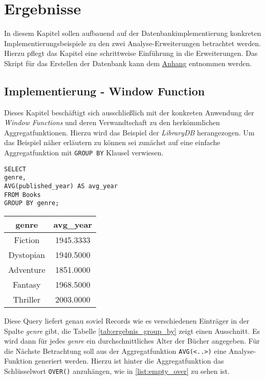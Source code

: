 \chapter{Ergebnisse}
\label{chap:ergebnis} In diesem Kapitel sollen aufbauend auf der Datenbankimplementierung
konkreten Implementierungsbeispiele zu den zwei Analyse-Erweiterungen betrachtet
werden. Hierzu pflegt das Kapitel eine schrittweise Einführung in die
Erweiterungen. Das Skript für das Erstellen der Datenbank kann dem \hyperref[sec:library_db]{Anhang}
entnommen werden.

\section{Implementierung - Window Function}
\label{sec:window_function} Dieses Kapitel beschäftigt sich ausschließlich mit der
konkreten Anwendung der \textit{Window Functions} und deren Verwandtschaft zu
den herkömmlichen Aggregatfunktionen. Hierzu wird das Beispiel der \textit{LibraryDB}
herangezogen. Um das Beispiel näher erläutern zu können sei zunächst auf eine einfache
Aggregatfunktion mit \texttt{GROUP BY} Klausel verwiesen.

\begin{minipage}{0.55\textwidth}
	 \begin{lstlisting}
SELECT
genre,
AVG(published_year) AS avg_year
FROM Books
GROUP BY genre;
	\end{lstlisting}
\end{minipage}
\hfill
\begin{minipage}{0.45\textwidth}
	\centering
	\begin{tabular}{|c|c|}
		\hline
		\textbf{genre} & \textbf{avg\_year} \\
		\hline
		Fiction        & 1945.3333          \\
		\hline
		Dystopian      & 1940.5000          \\
		\hline
		Adventure      & 1851.0000          \\
		\hline
		Fantasy        & 1968.5000          \\
		\hline
		Thriller       & 2003.0000          \\
		\hline
	\end{tabular}
	 \label{tab:ergebnis_group_by}
\end{minipage}

Diese Query liefert genau soviel Records wie es verschiedenen Einträger in der Spalte
\textit{genre} gibt, die Tabelle \ref{tab:ergebnis_group_by} zeigt einen Ausschnitt.
Es wird dann für jedes \textit{genre} ein durchschnittliches Alter der Bücher angegeben.
Für die Nächste Betrachtung soll aus der Aggregatfunktion \texttt{AVG(<..>)} eine
Analyse-Funktion generiert werden. Hierzu ist hinter die Aggregatfunktion das
Schlüsselwort \texttt{OVER()} anzuhängen, wie in \ref{list:empty_over} zu sehen
ist.

